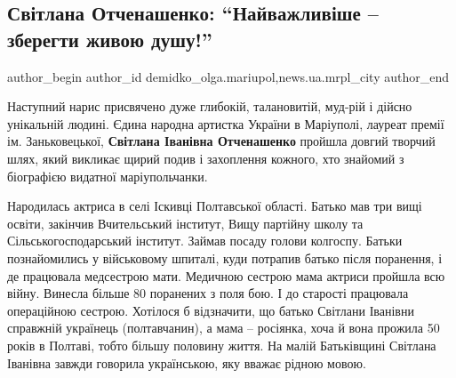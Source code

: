  
 
 
 
 
 
\subsection{Світлана Отченашенко: \enquote{Найважливіше – зберегти живою душу!}}
\label{sec:17_07_2019.stz.news.ua.mrpl_city.1.svitlana_otchenashenko_zberegty_zhyvoju_dushu}
 
\ifcmt
 author_begin
   author_id demidko_olga.mariupol,news.ua.mrpl_city
 author_end
\fi


Наступний нарис присвячено дуже глибокій, талановитій, муд\hyp{}рій і дійсно
унікальній людині. Єдина народна артистка України в Маріуполі, лауреат премії
ім. Заньковецької, \textbf{Світлана Іванівна Отченашенко} пройшла довгий творчий шлях,
який викликає щирий подив і захоплення кожного, хто знайомий з біографією
видатної маріупольчанки.



Народилась актриса в селі Іскивці Полтавської області. Батько мав три вищі
освіти, закінчив Вчительський інститут, Вищу партійну школу та
Сільськогосподарський інститут. Займав посаду голови колгоспу. Батьки
познайомились у військовому шпиталі, куди потрапив батько після поранення, і де
працювала медсестрою мати. Медичною сестрою мама актриси пройшла всю війну.
Винесла більше 80 поранених з поля бою. І до старості працювала операційною
сестрою. Хотілося б відзначити, що батько Світлани Іванівни справжній українець
(полтавчанин), а мама – росіянка, хоча й вона прожила 50 років в Полтаві, тобто
більшу половину життя. На малій Батьківщині Світлана Іванівна завжди говорила
українською, яку вважає рідною мовою.

